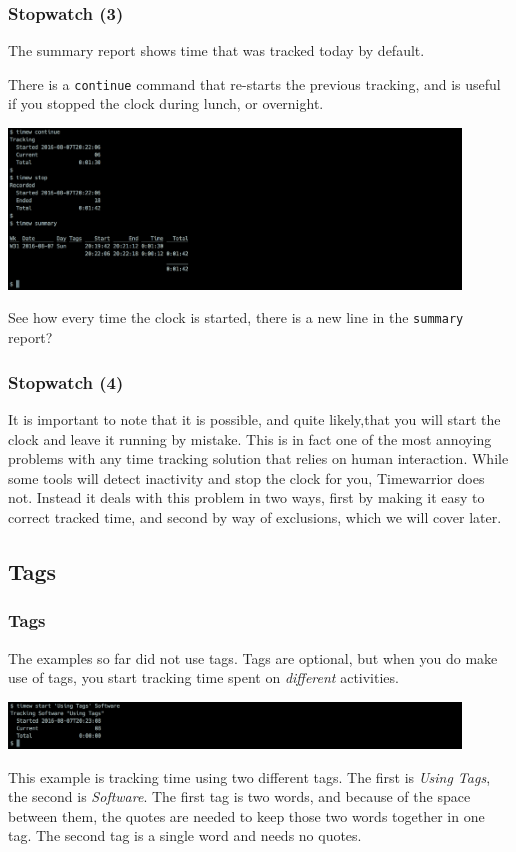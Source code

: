 \documentclass[t,handout]{beamer}
\begin{document}
\begin{frame}[fragile]\frametitle{Stopwatch (3)}
    The summary report shows time that was tracked today by default.

    There is a \verb=continue= command that re-starts the previous tracking, and is useful if you stopped the clock during lunch, or overnight.

    \includegraphics[width=12cm]{images/tutorial7.png}

    See how every time the clock is started, there is a new line in the \verb=summary= report?
\end{frame}

\begin{frame}[fragile]\frametitle{Stopwatch (4)}
    It is important to note that it is possible, and quite likely,that you will start the clock and leave it running by mistake. This is in fact one of the most annoying problems with any time tracking solution that relies on human interaction. While some tools will detect inactivity and stop the clock for you, Timewarrior does not. Instead it deals with this problem in two ways, first by making it easy to correct tracked time, and second by way of exclusions, which we will cover later.
\end{frame}

\subsection{Tags}

\begin{frame}[fragile]\frametitle{Tags}
    The examples so far did not use tags. Tags are optional, but when you do make use of tags, you start tracking time spent on \textit{different} activities.

    \includegraphics[width=12cm]{images/tutorial8.png}

    This example is tracking time using two different tags. The first is \textit{Using Tags}, the second is \textit{Software}. The first tag is two words, and because of the space between them, the quotes are needed to keep those two words together in one tag. The second tag is a single word and needs no quotes.
\end{frame}
\end{document}
